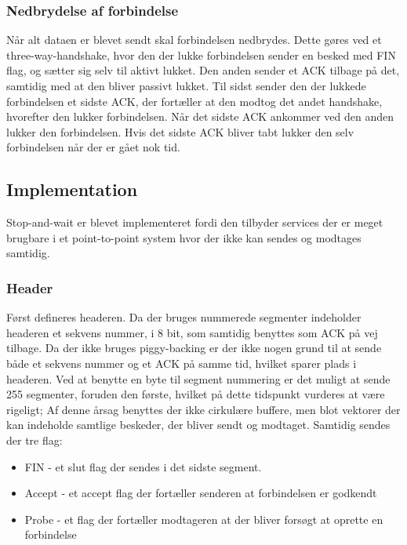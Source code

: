 \subsubsection {Nedbrydelse af forbindelse}

Når alt dataen er blevet sendt skal forbindelsen nedbrydes. Dette gøres ved et three-way-handshake, hvor den der lukke forbindelsen sender en besked med FIN flag, og sætter sig selv til aktivt lukket. Den anden sender et ACK tilbage på det, samtidig med at den bliver passivt lukket. Til sidst sender den der lukkede forbindelsen et sidste ACK, der fortæller at den modtog det andet handshake, hvorefter den lukker forbindelsen. Når det sidste ACK ankommer ved den anden lukker den forbindelsen. Hvis det sidste ACK bliver tabt lukker den selv forbindelsen når der er gået nok tid.

\subsection{Implementation}

Stop-and-wait er blevet implementeret fordi den tilbyder services der er meget brugbare i et point-to-point system hvor der ikke kan sendes og modtages samtidig.
\subsubsection{Header}

Først defineres headeren. Da der bruges nummerede segmenter indeholder headeren et sekvens nummer, i 8 bit, som samtidig benyttes som ACK på vej tilbage. Da der ikke bruges piggy-backing er der ikke nogen grund til at sende både et sekvens nummer og et ACK på samme tid, hvilket sparer plads i headeren. Ved at benytte en byte til segment nummering er det muligt at sende 255 segmenter, foruden den første, hvilket på dette tidspunkt vurderes at være rigeligt; Af denne årsag benyttes der ikke cirkulære buffere, men blot vektorer der kan indeholde samtlige beskeder, der bliver sendt og modtaget. Samtidig sendes der tre flag:

\begin{itemize}
\item FIN - et slut flag der sendes i det sidste segment.
\item Accept - et accept flag der fortæller senderen at forbindelsen er godkendt
\item Probe - et flag der fortæller modtageren at der bliver forsøgt at oprette en forbindelse
\end{itemize}

